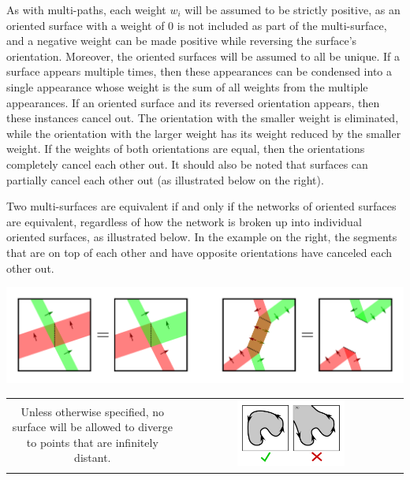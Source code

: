 As with multi-paths, each weight \(w_i\) will be assumed to be strictly positive, as an oriented surface with a weight of 0 is not included as part of the multi-surface, and a negative weight can be made positive while reversing the surface's orientation. Moreover, the oriented surfaces will be assumed to all be unique. If a surface appears multiple times, then these appearances can be condensed into a single appearance whose weight is the sum of all weights from the multiple appearances. If an oriented surface and its reversed orientation appears, then these instances cancel out. The orientation with the smaller weight is eliminated, while the orientation with the larger weight has its weight reduced by the smaller weight. If the weights of both orientations are equal, then the orientations completely cancel each other out. It should also be noted that surfaces can partially cancel each other out (as illustrated below on the right). 

Two multi-surfaces are equivalent if and only if the networks of oriented surfaces are equivalent, regardless of how the network is broken up into individual oriented surfaces, as illustrated below. In the example on the right, the segments that are on top of each other and have opposite orientations have canceled each other out.     
\begin{center}
\includegraphics[scale = 0.5]{Multi-structures/Multisurfaces/multi-surface_decomposition}
\end{center}

\begin{center}
\begin{tabular}{cc}
\parbox{0.5\textwidth}{
Unless otherwise specified, no surface will be allowed to diverge to points that are infinitely distant.
} & \parbox{0.5\textwidth}{
\includegraphics[width = 0.5\textwidth]{Multi-structures/Multisurfaces/no_infinite_surfaces}
}
\end{tabular}
\end{center}






